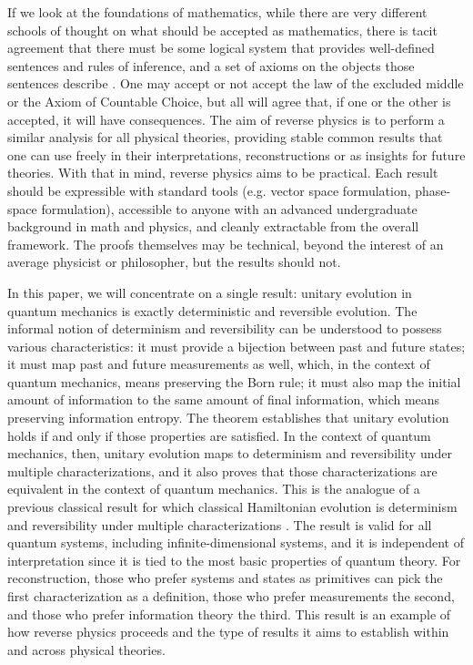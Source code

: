\documentclass[entropy,article,submit,moreauthors]{Definitions/mdpi}
\begin{document}
If we look at the foundations of mathematics, while there are very different schools of thought on what should be accepted as mathematics, there is tacit agreement that there must be some logical system that provides well-defined sentences and rules of inference, and a set of axioms on the objects those sentences describe \cite{Horsten2022,Ferreiros2008}. One may accept or not accept the law of the excluded middle or the Axiom of Countable Choice, but all will agree that, if one or the other is accepted, it will have consequences. The aim of reverse physics \cite{aop-phys-ReversePhysics} is to perform a similar analysis for all physical theories, providing stable common results that one can use freely in their interpretations, reconstructions or as insights for future theories. With that in mind, reverse physics aims to be practical. Each result should be expressible with standard tools (e.g. vector space formulation, phase-space formulation), accessible to anyone with an advanced undergraduate background in math and physics, and cleanly extractable from the overall framework. The proofs themselves may be technical, beyond the interest of an average physicist or philosopher, but the results should not.

In this paper, we will concentrate on a single result: unitary evolution in quantum mechanics is exactly deterministic and reversible evolution. The informal notion of determinism and reversibility can be understood to possess various characteristics: it must provide a bijection between past and future states; it must map past and future measurements as well, which, in the context of quantum mechanics, means preserving the Born rule; it must also map the initial amount of information to the same amount of final information, which means preserving information entropy. The theorem establishes that unitary evolution holds if and only if those properties are satisfied. In the context of quantum mechanics, then, unitary evolution maps to determinism and reversibility under multiple characterizations, and it also proves that those characterizations are equivalent in the context of quantum mechanics. This is the analogue of a previous classical result for which classical Hamiltonian evolution is determinism and reversibility under multiple characterizations \cite{aop-book,aop-phil-Hamiltonianinformation}. The result is valid for all quantum systems, including infinite-dimensional systems, and it is independent of interpretation since it is tied to the most basic properties of quantum theory. For reconstruction, those who prefer systems and states as primitives can pick the first characterization as a definition, those who prefer measurements the second, and those who prefer information theory the third. This result is an example of how reverse physics proceeds and the type of results it aims to establish within and across physical theories.
\end{document}
